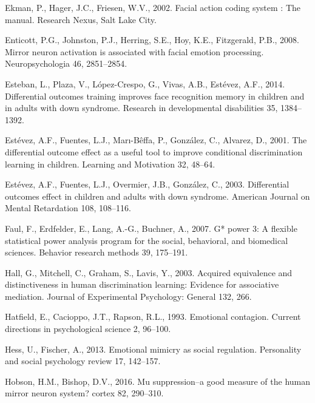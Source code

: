 \documentclass[]{elsarticle} %
\begin{document}
\leavevmode\hypertarget{ref-ekman_facial_2002}{}%
Ekman, P., Hager, J.C., Friesen, W.V., 2002. Facial action coding system
: The manual. Research Nexus, Salt Lake City.

\leavevmode\hypertarget{ref-enticott2008mirror}{}%
Enticott, P.G., Johnston, P.J., Herring, S.E., Hoy, K.E., Fitzgerald,
P.B., 2008. Mirror neuron activation is associated with facial emotion
processing. Neuropsychologia 46, 2851--2854.

\leavevmode\hypertarget{ref-esteban2014differential}{}%
Esteban, L., Plaza, V., López-Crespo, G., Vivas, A.B., Estévez, A.F.,
2014. Differential outcomes training improves face recognition memory in
children and in adults with down syndrome. Research in developmental
disabilities 35, 1384--1392.

\leavevmode\hypertarget{ref-estevez2001differential}{}%
Estévez, A.F., Fuentes, L.J., Marı-Bêffa, P., González, C., Alvarez, D.,
2001. The differential outcome effect as a useful tool to improve
conditional discrimination learning in children. Learning and Motivation
32, 48--64.

\leavevmode\hypertarget{ref-estevez2003differential}{}%
Estévez, A.F., Fuentes, L.J., Overmier, J.B., González, C., 2003.
Differential outcomes effect in children and adults with down syndrome.
American Journal on Mental Retardation 108, 108--116.

\leavevmode\hypertarget{ref-faul2007g}{}%
Faul, F., Erdfelder, E., Lang, A.-G., Buchner, A., 2007. G* power 3: A
flexible statistical power analysis program for the social, behavioral,
and biomedical sciences. Behavior research methods 39, 175--191.

\leavevmode\hypertarget{ref-hall2003acquired}{}%
Hall, G., Mitchell, C., Graham, S., Lavis, Y., 2003. Acquired
equivalence and distinctiveness in human discrimination learning:
Evidence for associative mediation. Journal of Experimental Psychology:
General 132, 266.

\leavevmode\hypertarget{ref-hatfield1993emotional}{}%
Hatfield, E., Cacioppo, J.T., Rapson, R.L., 1993. Emotional contagion.
Current directions in psychological science 2, 96--100.

\leavevmode\hypertarget{ref-hess2013emotional}{}%
Hess, U., Fischer, A., 2013. Emotional mimicry as social regulation.
Personality and social psychology review 17, 142--157.

\leavevmode\hypertarget{ref-hobson2016mu}{}%
Hobson, H.M., Bishop, D.V., 2016. Mu suppression--a good measure of the
human mirror neuron system? cortex 82, 290--310.
\end{document}
